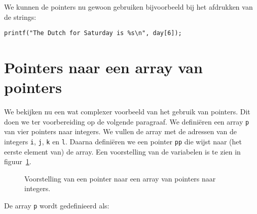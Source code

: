 We kunnen de pointers nu gewoon gebruiken bijvoorbeeld bij het afdrukken van de strings:

\begin{lstlisting}[style=lstoneline]
printf("The Dutch for Saturday is %s\n", day[6]);
\end{lstlisting}



\section{Pointers naar een array van pointers}
\label{sec:pointersnaareenarrayvanpointers}

We bekijken nu een wat complexer voorbeeld van het gebruik van pointers. Dit doen we ter voorbereiding op de volgende paragraaf. We definiëren een array \texttt{p} van vier pointers naar integers. We vullen de array met de adressen van de integers \texttt{i}, \texttt{j}, \texttt{k} en \texttt{l}. Daarna definiëren we een pointer \texttt{pp} die wijst naar (het eerste element van) de array. Een voorstelling van de variabelen is te zien in figuur~\ref{fig:poipointertoarrayofpointers}.

\begin{figure}[!ht]
\centering
{}
\caption{Voorstelling van een pointer naar een array van pointers naar integers.}
\label{fig:poipointertoarrayofpointers}
\end{figure}

De array \texttt{p} wordt gedefinieerd als:

